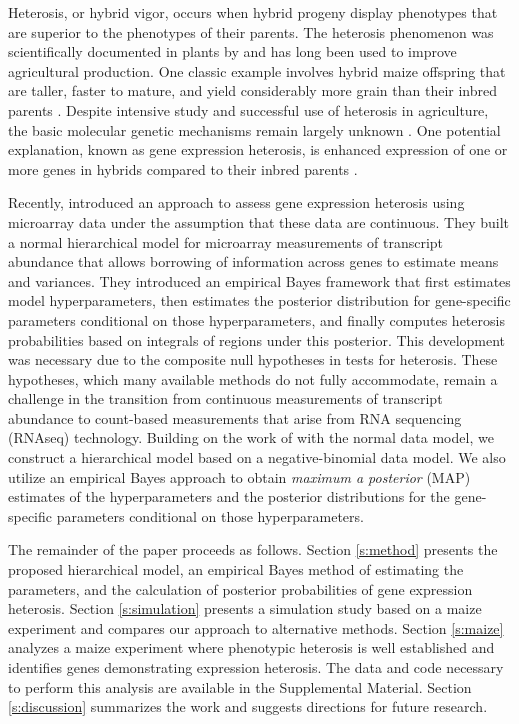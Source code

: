 \documentclass[useAMS,usenatbib,referee]{biom}
\newcommand{\RNAseq}{RNAseq}
\begin{document}
Heterosis, or hybrid vigor, occurs when hybrid progeny display phenotypes that are superior to the phenotypes of their parents.  The heterosis phenomenon was scientifically documented in plants by \cite{darwin1876effects}and has long been used to improve agricultural production.  One classic example involves hybrid maize offspring that are taller, faster to mature, and yield considerably more grain than their inbred parents \citep{hallauer1981quantitative, hallauer2010quantitative}.  Despite intensive study and successful use of heterosis in agriculture, the basic molecular genetic mechanisms remain largely unknown \citep{coors1999genetics, lippman2007heterosis}. One potential explanation, known as gene expression heterosis, is enhanced expression of one or more genes in hybrids compared to their inbred parents \citep{swanson2006all, springer2007allelic}.

Recently, \cite{ji2014estimation} introduced an approach to assess gene expression heterosis using microarray data under the assumption that these data are continuous. They built a normal hierarchical model for microarray measurements of transcript abundance that allows borrowing of information across genes to estimate means and variances. They introduced an empirical Bayes framework that first estimates model hyperparameters, then estimates the posterior distribution for gene-specific parameters conditional on those hyperparameters, and finally computes heterosis probabilities based on integrals of regions under this posterior. This development was necessary due to the composite null hypotheses in tests for heterosis. These hypotheses, which many available methods do not fully accommodate, remain a challenge in the transition from continuous measurements of transcript abundance to count-based measurements that arise from RNA sequencing (\RNAseq{}) technology. Building on the work of \citeauthor{ji2014estimation} with the normal data model, we construct a hierarchical model based on a negative-binomial data model. We also utilize an empirical Bayes approach to obtain \emph{maximum a posterior} (MAP) estimates of the hyperparameters and the posterior distributions for the gene-specific parameters conditional on those hyperparameters. 

The remainder of the paper proceeds as follows. Section \ref{s:method} presents the proposed hierarchical model, an empirical Bayes method of estimating the parameters, and the calculation of posterior probabilities of gene expression heterosis. Section \ref{s:simulation} presents a simulation study based on a maize experiment and compares our approach to alternative methods. Section \ref{s:maize} analyzes a maize experiment where phenotypic heterosis is well established and identifies genes demonstrating expression heterosis. The data and code necessary to perform this analysis are available in the Supplemental Material. Section \ref{s:discussion} summarizes the work and suggests directions for future research.
\end{document}
